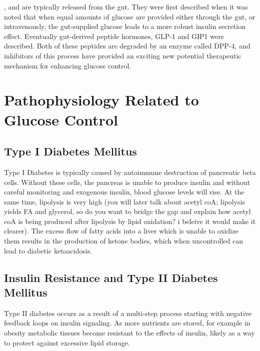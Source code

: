 \documentclass{tufte-handout}
\begin{document}
, and are typically released from the gut.  They were first described when it was noted that when equal amounts of glucose are provided either through the gut, or intravenously, the gut-supplied glucose leads to a more robust insulin secretion effect.  Eventually gut-derived peptide hormones, GLP-1 and GIP1 were described.  Both of these peptides are degraded by an enzyme called DPP-4, and inhibitors of this process have provided an exciting new potential therapeutic mechanism for enhancing glucose control.

\section{Pathophysiology Related to Glucose Control}

\subsection{Type I Diabetes Mellitus}

Type I Diabetes is typically caused by autoimmune destruction of pancreatic beta cells.  Without these cells, the pancreas is unable to produce insulin and without careful monitoring and exogenous insulin, blood glucose levels will rise.  At the same time, lipolysis is very high (you will later talk about acetyl coA; lipolysis yields FA and glycerol, so do you want to bridge the gap and explain how acetyl coA is being produced after lipolysis by lipid oxidation? i beleive it would make it clearer).  The excess flow of fatty acids into a liver which is unable to oxidize them results in the production of ketone bodies, which when uncontrolled can lead to diabetic ketoacidosis.

\subsection{Insulin Resistance and Type II Diabetes Mellitus}

Type II diabetes occurs as a result of a multi-step process starting with negative feedback loops on insulin signaling.  As more nutrients are stored, for example in obesity metabolic tissues become resistant to the effects of insulin, likely as a way to protect against excessive lipid storage.  
\end{document}
